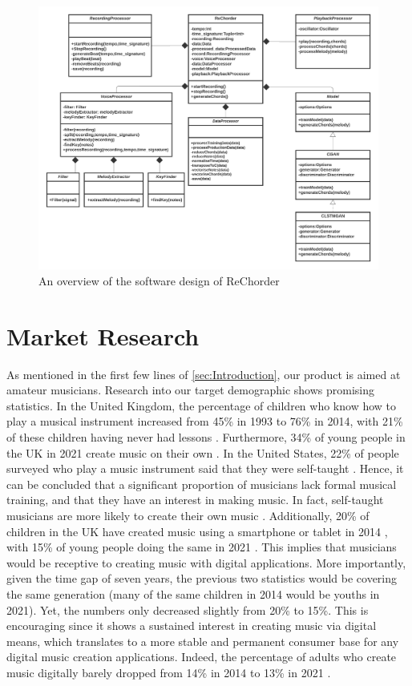 \begin{figure}
    \centering
    \includegraphics[width=\columnwidth]{Figures/SoftwareOverview}
    \decoRule
    \caption[]{An overview of the software design of ReChorder}
    \label{fig:SoftwareOverview}
\end{figure}

\section{Market Research}
\label{marketresearch}
As mentioned in the first few lines of \cref{sec:Introduction}, our product is aimed at amateur musicians. Research into our target demographic shows promising statistics. In the United Kingdom, the percentage of children who know how to play a musical instrument increased from 45\% in 1993 to 76\% in 2014, with 21\% of these children having never had lessons \cite{abrsm2014}. Furthermore, 34\% of young people in the UK in 2021 create music on their own \cite{abrsm2021}. In the United States, 22\% of people surveyed who play a music instrument said that they were self-taught \cite{gallup2003}. Hence, it can be concluded that a significant proportion of musicians lack formal musical training, and that they have an interest in making music. In fact, self-taught musicians are more likely to create their own music \cite{compareguitarpiano}. Additionally, 20\% of children in the UK have created music using a smartphone or tablet in 2014 \cite{abrsm2014}, with 15\% of young people doing the same in 2021 \cite{abrsm2021}. This implies that musicians would be receptive to creating music with digital applications. More importantly, given the time gap of seven years, the previous two statistics would be covering the same generation (many of the same children in 2014 would be youths in 2021). Yet, the numbers only decreased slightly from 20\% to 15\%. This is encouraging since it shows a sustained interest in creating music via digital means, which translates to a more stable and permanent consumer base for any digital music creation applications. Indeed, the percentage of adults who create music digitally barely dropped from 14\% in 2014 to 13\% in 2021 \cite{abrsm2021}.
 
